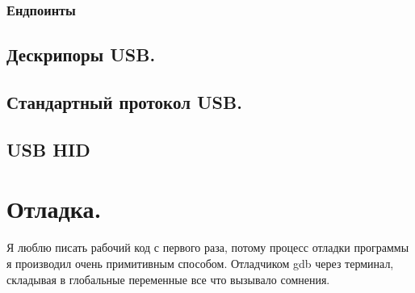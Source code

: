 \documentclass[12pt,a4paper]{article}
\begin{document}
\subsubsection{Ендпоинты}

\subsection{Дескрипоры USB.}

\subsection{Стандартный протокол USB.}

\subsection{USB HID}

\section{Отладка.}
    Я люблю писать рабочий код с первого раза, потому процесс отладки
    программы я производил очень примитивным способом. Отладчиком gdb через
    терминал, складывая в глобальные переменные все что вызывало сомнения.


\end{document}
